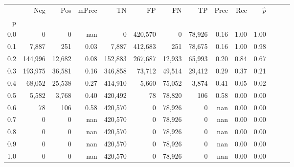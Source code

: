 \begin{tabular}{rrrrrrrrrrrrrr}
\toprule
{} &      Neg &     Pos & mPrec &       TN &       FP &      FN &      TP &  Prec &   Rec & $\hat{p}$ \\
p   &          &         &       &          &          &         &         &       &       &           \\
\midrule
0.0 &        0 &       0 &   nan &        0 &  420,570 &       0 &  78,926 &  0.16 &  1.00 &      1.00 \\
0.1 &    7,887 &     251 &  0.03 &    7,887 &  412,683 &     251 &  78,675 &  0.16 &  1.00 &      0.98 \\
0.2 &  144,996 &  12,682 &  0.08 &  152,883 &  267,687 &  12,933 &  65,993 &  0.20 &  0.84 &      0.67 \\
0.3 &  193,975 &  36,581 &  0.16 &  346,858 &   73,712 &  49,514 &  29,412 &  0.29 &  0.37 &      0.21 \\
0.4 &   68,052 &  25,538 &  0.27 &  414,910 &    5,660 &  75,052 &   3,874 &  0.41 &  0.05 &      0.02 \\
0.5 &    5,582 &   3,768 &  0.40 &  420,492 &       78 &  78,820 &     106 &  0.58 &  0.00 &      0.00 \\
0.6 &       78 &     106 &  0.58 &  420,570 &        0 &  78,926 &       0 &   nan &  0.00 &      0.00 \\
0.7 &        0 &       0 &   nan &  420,570 &        0 &  78,926 &       0 &   nan &  0.00 &      0.00 \\
0.8 &        0 &       0 &   nan &  420,570 &        0 &  78,926 &       0 &   nan &  0.00 &      0.00 \\
0.9 &        0 &       0 &   nan &  420,570 &        0 &  78,926 &       0 &   nan &  0.00 &      0.00 \\
1.0 &        0 &       0 &   nan &  420,570 &        0 &  78,926 &       0 &   nan &  0.00 &      0.00 \\
\bottomrule
\end{tabular}
